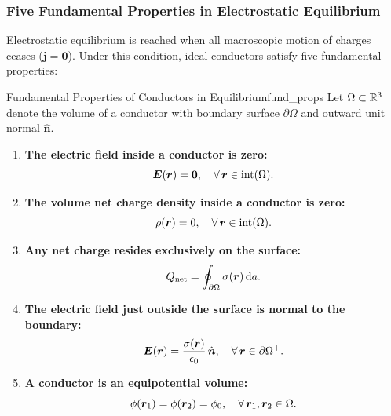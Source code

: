 \subsubsection{Five Fundamental Properties in Electrostatic Equilibrium}

Electrostatic equilibrium is reached when all macroscopic motion of charges ceases (\(\bm{j} = \bm{0}\)). Under this condition, ideal conductors satisfy five fundamental properties:

\begin{proposition}{Fundamental Properties of Conductors in Equilibrium}{fund_props}
    Let \(\Omega \subset \mathbb{R}^3\) denote the volume of a conductor with boundary surface \(\partial\Omega\) and outward unit normal \(\hat{\bm{n}}\).
    \begin{enumerate}
        \item \textbf{The electric field inside a conductor is zero:}
        \begin{equation}
            \bm{E}(\bm{r}) = \bm{0}, \quad \forall\, \bm{r} \in \mathrm{int}(\Omega).
        \end{equation}
        \item \textbf{The volume net charge density inside a conductor is zero:}
        \begin{equation}
            \rho(\bm{r}) = 0, \quad \forall\, \bm{r} \in \mathrm{int}(\Omega).
        \end{equation}
        \item \textbf{Any net charge resides exclusively on the surface:}
        \begin{equation}
            Q_{\text{net}} = \oint_{\partial\Omega} \sigma(\bm{r}) \, \dd a.
        \end{equation}
        \item \textbf{The electric field just outside the surface is normal to the boundary:}
        \begin{equation}
            \bm{E}(\bm{r}) = \frac{\sigma(\bm{r})}{\epsilon_0}\,\hat{\bm{n}}, \quad \forall\, \bm{r} \in \partial\Omega^+.
        \end{equation}
        \item \textbf{A conductor is an equipotential volume:}
        \begin{equation}
            \phi(\bm{r}_1) = \phi(\bm{r}_2) = \phi_0, \quad \forall\, \bm{r}_1, \bm{r}_2 \in \Omega.
        \end{equation}
    \end{enumerate}
\end{proposition}


